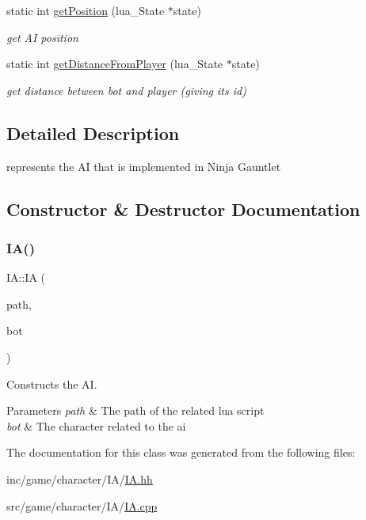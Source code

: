 \begin{DoxyCompactItemize}
\mbox{\label{classIA_a528b38ddf9f67ec6d226969360adab46}} 
static int \hyperlink{classIA_a528b38ddf9f67ec6d226969360adab46}{get\+Position} (lua\+\_\+\+State $\ast$state)
\begin{DoxyCompactList}\small\item\em get AI position \end{DoxyCompactList}\item 
\mbox{\label{classIA_aeedb20926ec98fd6f9d3686399640793}} 
static int \hyperlink{classIA_aeedb20926ec98fd6f9d3686399640793}{get\+Distance\+From\+Player} (lua\+\_\+\+State $\ast$state)
\begin{DoxyCompactList}\small\item\em get distance between bot and player (giving its id) \end{DoxyCompactList}\end{DoxyCompactItemize}


\subsection{Detailed Description}
represents the AI that is implemented in Ninja Gauntlet 

\subsection{Constructor \& Destructor Documentation}
\mbox{\label{classIA_a0733aa0c9dd00b142f8b474fc3b0b714}} 
\subsubsection{\texorpdfstring{I\+A()}{IA()}}
{\footnotesize\ttfamily I\+A\+::\+IA (\begin{DoxyParamCaption}\item[{std\+::string const}]{path,  }\item[{A\+Character $\ast$}]{bot }\end{DoxyParamCaption})}



Constructs the AI. 


\begin{DoxyParams}{Parameters}
{\em path} & The path of the related lua script \\
\hline
{\em bot} & The character related to the ai \\
\hline
\end{DoxyParams}


The documentation for this class was generated from the following files\+:\begin{DoxyCompactItemize}
\item 
inc/game/character/\+I\+A/\hyperlink{IA_8hh}{I\+A.\+hh}\item 
src/game/character/\+I\+A/\hyperlink{IA_8cpp}{I\+A.\+cpp}\end{DoxyCompactItemize}
